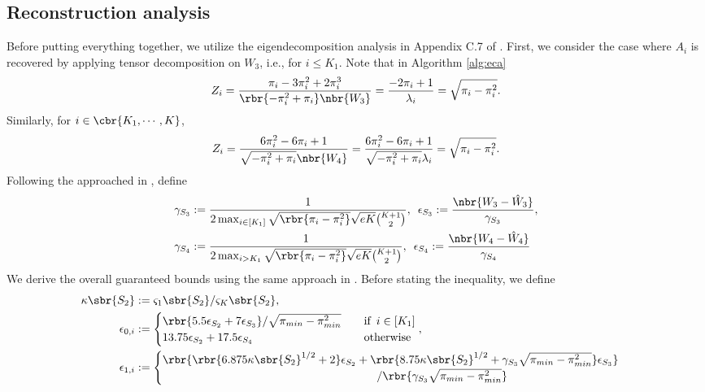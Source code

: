 \documentclass[twoside,11pt]{article}
\begin{document}
{\subsection{Reconstruction analysis}
Before putting everything together, we utilize the eigendecomposition analysis in Appendix C.7 of \cite{HsuKak12}. First, we consider the case where $A_i$ is recovered by applying tensor decomposition on $W_3$, i.e., for $i \leq K_1$. Note that in Algorithm \ref{alg:eca}
  \begin{align}
    Z_i = \frac{\pi_i - 3\pi_i^2 + 2\pi_i^3}{\rbr{-\pi_i^2 + \pi_i} \nbr{W_3}}  
          = \frac{-2 \pi_i + 1}{ \lambda_i} =   \sqrt{\pi_i-\pi_i^2}.
  \end{align}
Similarly, for $i \in \cbr{K_1, \cdots, K}$,
  \begin{align}
    Z_i = \frac{6\pi_i^2 - 6\pi_i + 1}{\sqrt{-\pi_i^2 + \pi_i} \nbr{ W_4}}  
         =  \frac{6\pi_i^2 - 6\pi_i + 1}{\sqrt{-\pi_i^2 + \pi_i} \lambda_i} =   \sqrt{\pi_i-\pi_i^2}.
  \end{align}
Following the approached in \cite{HsuKak12}, define 
\begin{align*}
\gamma_{S_3} &:= \frac{1}{2\max_{i \in [K_1]} \sqrt{  \rbr{\pi_i-\pi_i^2} }\sqrt{eK}\binom{K+1}{2}  },
 \,\,\,\epsilon_{S_3} := \frac{\nbr{W_3 - \hat{W}_3}}{  \gamma_{S_3}}
,\\
 \gamma_{S_4} &:= \frac{1}{2\max_{i > K_1 }\sqrt{  \rbr{\pi_i-\pi_i^2} }\sqrt{eK}  \binom{K+1}{2} },\,\,\,
  \epsilon_{S_4} := \frac{\nbr{W_4 - \hat{W}_4}}{ \gamma_{S_4}}
\end{align*}
 We derive the overall guaranteed bounds using the same approach in \cite{HsuKak12}. Before stating the inequality, we define
\begin{align*}
    \kappa\sbr{S_2} &:= \varsigma_1\sbr{S_2} / \varsigma_K \sbr{S_2},\\
    \epsilon_{0,i} &:= \begin{cases} \rbr{5.5 \epsilon_{S_2} + 7 \epsilon_{S_3}}/\sqrt{\pi_{min}-\pi_{min}^2 } \,\,\,\,\,\,& \text{if}\,\,\, i \in [K_1]\\
                         13.75 \epsilon_{S_2} + 17.5 \epsilon_{S_4}   & \text{otherwise} \end{cases},\\
\epsilon_{1,i} &:= \begin{cases} \rbr{\rbr{6.875 \kappa \sbr{S_2}^{1/2}+2 } \epsilon_{S_2} + \rbr{ 8.75 \kappa \sbr{S_2}^{1/2} + \gamma_{S_3} \sqrt{\pi_{min}-\pi_{min}^2 }}\epsilon_{S_3}}\\
             \,\,\,\,\,\,\,\,\,\,\,\,\,\,\,\,\,\,\,\,\,\,\,\,\,\,\,\,\,\,\,\,\,\,\,\,\,\,\,\,\,\,\,\,\,\,\,\,\,\,\,\,\,\,\,\,\,\,\,\,\,\,\,\,\,\,\,\,\,\,\,\,\,\,\,\,\,\,\,\,\,\,\,\,\,\,\,\,\,\,\,\,\,\,\,\,\,\,\,\,\,\,\,\,\,\,\,\,\,\,\,\ /\rbr{\gamma_{S_3} \sqrt{\pi_{min}-\pi_{min}^2 }}

\end{cases}
\end{align*}}
\end{document}
